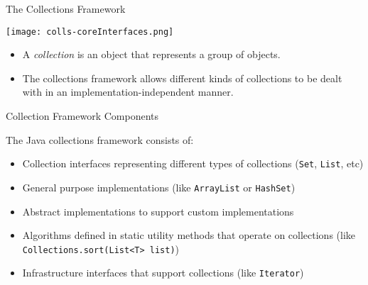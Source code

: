 \documentclass{beamer}
\begin{document}
\begin{frame}
  \titlepage
\end{frame}

\begin{frame}[fragile]{The Collections Framework}

\begin{center}
\texttt{[image: colls-coreInterfaces.png]}
\end{center}

\begin{itemize}
\item A {\it collection} is an object that represents a group of objects.
\item The collections framework allows different kinds of collections to be dealt with in an implementation-independent manner.
\end{itemize}


\end{frame}

\begin{frame}[fragile]{Collection Framework Components}

The Java collections framework consists of:
\begin{itemize}
\item Collection interfaces representing different types of collections ({\tt Set}, {\tt List}, etc)
\item General purpose implementations (like {\tt ArrayList} or {\tt HashSet})
\item Abstract implementations to support custom implementations
\item Algorithms defined in static utility methods that operate on collections (like {\tt Collections.sort(List<T> list)})
\item Infrastructure interfaces that support collections (like {\tt Iterator})
\end{itemize}

\end{frame}
\end{document}
